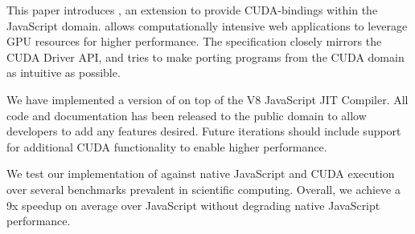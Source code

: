 
This paper introduces \namens, an extension to provide CUDA-bindings within the
JavaScript domain. \name allows computationally intensive  web applications to
leverage GPU resources for higher performance. The specification closely mirrors
the CUDA Driver API, and tries to make porting programs from the CUDA domain as
intuitive as possible.

We have implemented a version of \name on top of the V8 JavaScript JIT
Compiler.  All code and documentation has been released to the public domain to
allow developers to add any features desired. Future iterations should include
support for additional CUDA functionality to enable higher performance.

We test our implementation of \name against native JavaScript and CUDA execution
over several benchmarks prevalent in scientific computing. Overall, we achieve a
9x speedup on average over JavaScript without degrading native JavaScript performance.
